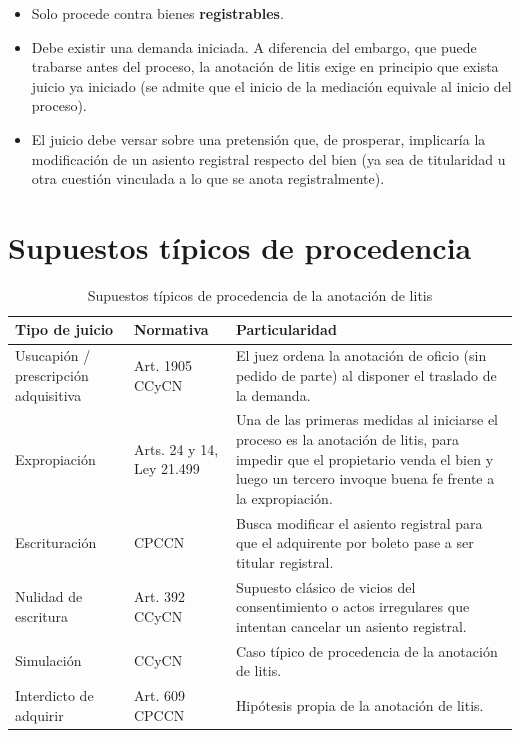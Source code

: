 \documentclass[12pt,oneside]{book}
\begin{document}
\begin{itemize}
    \item Solo procede contra bienes \textbf{registrables}.
    \item Debe existir una demanda iniciada. A diferencia del embargo, que puede trabarse antes del proceso, la anotación de litis exige en principio que exista juicio ya iniciado (se admite que el inicio de la mediación equivale al inicio del proceso).
    \item El juicio debe versar sobre una pretensión que, de prosperar, implicaría la modificación de un asiento registral respecto del bien (ya sea de titularidad u otra cuestión vinculada a lo que se anota registralmente).
\end{itemize}

\section{Supuestos típicos de procedencia}

\begin{table}[H]
\centering
\caption{Supuestos típicos de procedencia de la anotación de litis}
\begin{tabularx}{\textwidth}{l l X}
\toprule
\textbf{Tipo de juicio} & \textbf{Normativa} & \textbf{Particularidad} \\
\midrule
Usucapión / prescripción adquisitiva & Art. 1905 CCyCN & El juez ordena la anotación de oficio (sin pedido de parte) al disponer el traslado de la demanda. \\
\addlinespace
Expropiación & Arts. 24 y 14, Ley 21.499 & Una de las primeras medidas al iniciarse el proceso es la anotación de litis, para impedir que el propietario venda el bien y luego un tercero invoque buena fe frente a la expropiación. \\
\addlinespace
Escrituración & CPCCN & Busca modificar el asiento registral para que el adquirente por boleto pase a ser titular registral. \\
\addlinespace
Nulidad de escritura & Art. 392 CCyCN & Supuesto clásico de vicios del consentimiento o actos irregulares que intentan cancelar un asiento registral. \\
\addlinespace
Simulación & CCyCN & Caso típico de procedencia de la anotación de litis. \\
\addlinespace
Interdicto de adquirir & Art. 609 CPCCN & Hipótesis propia de la anotación de litis. \\
\bottomrule
\end{tabularx}
\end{table}
\end{document}

